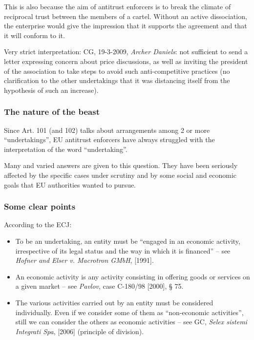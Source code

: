             This is also because the aim of antitrust enforcers is to break the climate of reciprocal trust between the members of a cartel. Without an active dissociation, the enterprise would give the impression that it supports the agreement and that it will conform to it.
        
            Very strict interpretation: CG, 19-3-2009, \textit{Archer Daniels}: not sufficient to send a letter expressing concern about price discussions, as well as inviting the president of the association to take steps to avoid such anti-competitive practices (no clarification to the other undertakings that it was distancing itself from the hypothesis of such an increase).

        \subsubsection{The nature of the beast}

            Since Art. 101 (and 102) talks about arrangements among 2 or more “undertakings”, EU antitrust enforcers have always struggled with the interpretation of the word “undertaking”.


            Many and varied answers are given to this question. They have been seriously affected by the specific cases under scrutiny and by some social and economic goals that EU authorities wanted to pursue.

        \subsubsection{Some clear points}

            According to the ECJ:
            \begin{itemize}
                \item To be an undertaking, an entity must be ``engaged in an economic activity, irrespective of its legal status and the way in which it is financed'' -- see \textit{Hofner and Elser v. Macrotron GMbH}, [1991].
                \item An economic activity is any activity consisting in offering goods or services on a given market -- see \textit{Pavlov}, case C-180/98 [2000], § 75.
                \item The various activities carried out by an entity must be considered individually. Even if we consider some of them as ``non-economic activities'', still we can consider the others as economic activities -- see GC, \textit{Selex sistemi Integrati Spa}, [2006] (principle of division).
            \end{itemize}

